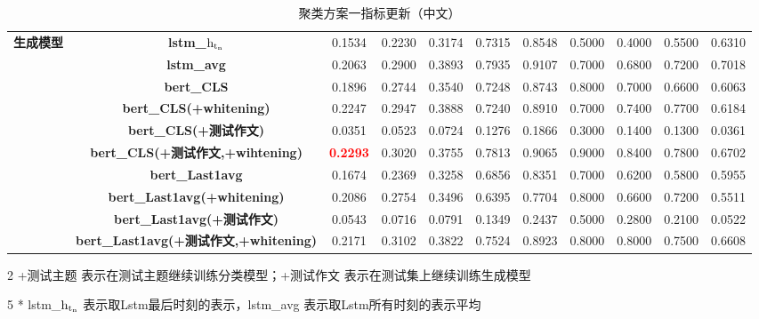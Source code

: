 \documentclass[11pt]{article}
\begin{document}
\begin{CJK}{UTF8}{gkai}
\begin{table}[htbp]
{\begin{tabular}{c|c|ccccccccc}
      \hline
      \multirow{10}[0]{*}{\textbf{生成模型}} & \textbf{lstm\_$\rm h_{t_n}$} & 0.1534  & 0.2230  & 0.3174  & 0.7315  & 0.8548  & 0.5000  & 0.4000  & 0.5500  & 0.6310  \\
      & \textbf{lstm\_avg} & 0.2063  & 0.2900  & 0.3893  & 0.7935  & 0.9107  & 0.7000  & 0.6800  & 0.7200  & 0.7018  \\
      \cline{2-11}
      & \textbf{bert\_CLS} & 0.1896  & 0.2744  & 0.3540  & 0.7248  & 0.8743  & 0.8000  & 0.7000  & 0.6600  & 0.6063  \\
      & \textbf{bert\_CLS(+whitening)} & 0.2247  & 0.2947  & 0.3888  & 0.7240  & 0.8910  & 0.7000  & 0.7400  & 0.7700  & 0.6184  \\
      & \textbf{bert\_CLS(+测试作文)} & 0.0351  & 0.0523  & 0.0724  & 0.1276  & 0.1866  & 0.3000  & 0.1400  & 0.1300  & 0.0361  \\
      & \textbf{bert\_CLS(+测试作文,+wihtening)} & \textbf{\textcolor{red}{0.2293}}  & 0.3020  & 0.3755  & 0.7813  & 0.9065  & 0.9000  & 0.8400  & 0.7800  & 0.6702  \\
      \cline{2-11}
      & \textbf{bert\_Last1avg} & 0.1674  & 0.2369  & 0.3258  & 0.6856  & 0.8351  & 0.7000  & 0.6200  & 0.5800  & 0.5955  \\
      & \textbf{bert\_Last1avg(+whitening)} & 0.2086  & 0.2754  & 0.3496  & 0.6395  & 0.7704  & 0.8000  & 0.6600  & 0.7200  & 0.5511  \\
      & \textbf{bert\_Last1avg(+测试作文)} & 0.0543  & 0.0716  & 0.0791  & 0.1349  & 0.2437  & 0.5000  & 0.2800  & 0.2100  & 0.0522  \\
      & \textbf{bert\_Last1avg(+测试作文,+whitening)} & 0.2171  & 0.3102  & 0.3822  & 0.7524  & 0.8923  & 0.8000  & 0.8000  & 0.7500  & 0.6608  \\
      \hline
    \end{tabular}}%
    \begin{tablenotes}    %
      \footnotesize               %
      \item[2] +测试主题 表示在测试主题继续训练分类模型；+测试作文 表示在测试集上继续训练生成模型
      \item[5] * lstm\_$\rm h_{t_n}$ 表示取Lstm最后时刻的表示，lstm\_avg 表示取Lstm所有时刻的表示平均 
    \end{tablenotes} 
    \caption{聚类方案一指标更新（中文）}
  \label{tab:addlabel}%
\end{table}%



\end{CJK}
\end{document}
